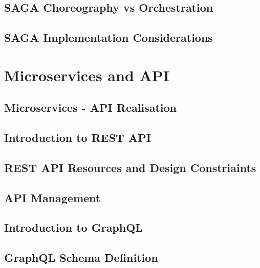 \section{SAGA Choreography vs Orchestration}
\section{SAGA Implementation Considerations}

\chapter{Microservices and API}
\section{Microservices - API Realisation}
\section{Introduction to REST API}
\section{REST API Resources and Design Constriaints}
\section{API Management}
\section{Introduction to GraphQL}
\section{GraphQL Schema Definition}